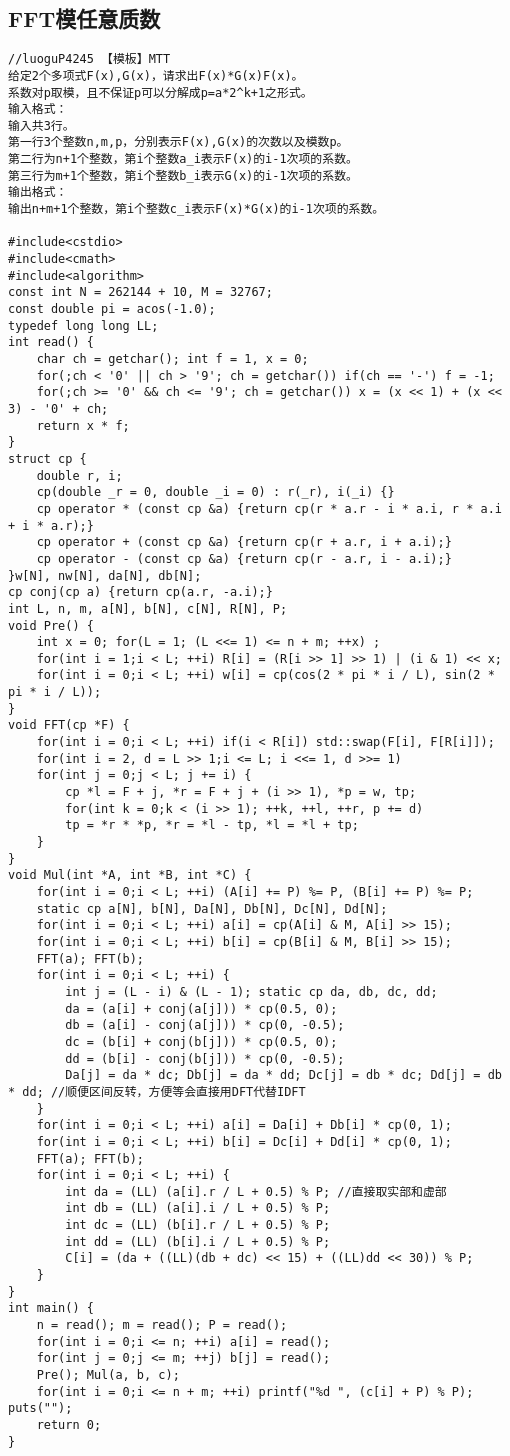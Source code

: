 \documentclass{article}
\begin{document}
\subsection{FFT模任意质数}
\begin{lstlisting}
//luoguP4245 【模板】MTT
给定2个多项式F(x),G(x)，请求出F(x)*G(x)F(x)。
系数对p取模，且不保证p可以分解成p=a*2^k+1之形式。
输入格式：
输入共3行。
第一行3个整数n,m,p，分别表示F(x),G(x)的次数以及模数p。
第二行为n+1个整数，第i个整数a_i表示F(x)的i-1次项的系数。
第三行为m+1个整数，第i个整数b_i表示G(x)的i-1次项的系数。
输出格式：
输出n+m+1个整数，第i个整数c_i表示F(x)*G(x)的i-1次项的系数。

#include<cstdio>
#include<cmath>
#include<algorithm>
const int N = 262144 + 10, M = 32767;
const double pi = acos(-1.0);
typedef long long LL;
int read() {
	char ch = getchar(); int f = 1, x = 0;
	for(;ch < '0' || ch > '9'; ch = getchar()) if(ch == '-') f = -1;
	for(;ch >= '0' && ch <= '9'; ch = getchar()) x = (x << 1) + (x << 3) - '0' + ch;
	return x * f;
}
struct cp {
	double r, i;
	cp(double _r = 0, double _i = 0) : r(_r), i(_i) {}
	cp operator * (const cp &a) {return cp(r * a.r - i * a.i, r * a.i + i * a.r);}
	cp operator + (const cp &a) {return cp(r + a.r, i + a.i);}
	cp operator - (const cp &a) {return cp(r - a.r, i - a.i);}
}w[N], nw[N], da[N], db[N];
cp conj(cp a) {return cp(a.r, -a.i);}
int L, n, m, a[N], b[N], c[N], R[N], P;
void Pre() {
	int x = 0; for(L = 1; (L <<= 1) <= n + m; ++x) ;
	for(int i = 1;i < L; ++i) R[i] = (R[i >> 1] >> 1) | (i & 1) << x;
	for(int i = 0;i < L; ++i) w[i] = cp(cos(2 * pi * i / L), sin(2 * pi * i / L));
}
void FFT(cp *F) {
	for(int i = 0;i < L; ++i) if(i < R[i]) std::swap(F[i], F[R[i]]);
	for(int i = 2, d = L >> 1;i <= L; i <<= 1, d >>= 1) 
	for(int j = 0;j < L; j += i) {
		cp *l = F + j, *r = F + j + (i >> 1), *p = w, tp;
		for(int k = 0;k < (i >> 1); ++k, ++l, ++r, p += d) 
		tp = *r * *p, *r = *l - tp, *l = *l + tp;
	}
}
void Mul(int *A, int *B, int *C) {
	for(int i = 0;i < L; ++i) (A[i] += P) %= P, (B[i] += P) %= P;
	static cp a[N], b[N], Da[N], Db[N], Dc[N], Dd[N];
	for(int i = 0;i < L; ++i) a[i] = cp(A[i] & M, A[i] >> 15);
	for(int i = 0;i < L; ++i) b[i] = cp(B[i] & M, B[i] >> 15);
	FFT(a); FFT(b);
	for(int i = 0;i < L; ++i) {
		int j = (L - i) & (L - 1); static cp da, db, dc, dd;
		da = (a[i] + conj(a[j])) * cp(0.5, 0);
		db = (a[i] - conj(a[j])) * cp(0, -0.5);
		dc = (b[i] + conj(b[j])) * cp(0.5, 0);
		dd = (b[i] - conj(b[j])) * cp(0, -0.5);
		Da[j] = da * dc; Db[j] = da * dd; Dc[j] = db * dc; Dd[j] = db * dd; //顺便区间反转，方便等会直接用DFT代替IDFT 
	}
	for(int i = 0;i < L; ++i) a[i] = Da[i] + Db[i] * cp(0, 1);
	for(int i = 0;i < L; ++i) b[i] = Dc[i] + Dd[i] * cp(0, 1);
	FFT(a); FFT(b);
	for(int i = 0;i < L; ++i) {
		int da = (LL) (a[i].r / L + 0.5) % P; //直接取实部和虚部 
		int db = (LL) (a[i].i / L + 0.5) % P;
		int dc = (LL) (b[i].r / L + 0.5) % P;
		int dd = (LL) (b[i].i / L + 0.5) % P;
		C[i] = (da + ((LL)(db + dc) << 15) + ((LL)dd << 30)) % P; 
	}
}
int main() {
	n = read(); m = read(); P = read();
	for(int i = 0;i <= n; ++i) a[i] = read();
	for(int j = 0;j <= m; ++j) b[j] = read();
	Pre(); Mul(a, b, c); 
	for(int i = 0;i <= n + m; ++i) printf("%d ", (c[i] + P) % P); puts("");
	return 0;
}



\end{lstlisting}
\end{document}
